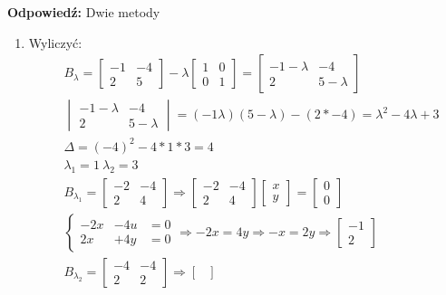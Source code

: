 \begin{enumerate}[label=\alph*)]
\textbf{Odpowiedź: } Dwie metody  
\begin{enumerate}[label=\Roman*:]
\item Wyliczyć:
\begin{align*}
&B_\lambda = \begin{bmatrix}
-1 & -4\\ 2 & 5
\end{bmatrix} - \lambda \begin{bmatrix}
1&0\\0&1
\end{bmatrix}=\begin{bmatrix}
-1-\lambda&-4\\
2&5-\lambda
\end{bmatrix}\\
&\begin{vmatrix}
-1-\lambda&-4\\
2&5-\lambda
\end{vmatrix}=(-1\lambda )(5-\lambda )-(2*-4)=\lambda ^2-4\lambda +3\\
&\Delta = (-4)^2-4*1*3=4\\
&\lambda _1 = 1\ \lambda _2 =3\\
&B_{\lambda _1}= \begin{bmatrix}
-2 & -4\\ 2 & 4
\end{bmatrix} \Rightarrow \begin{bmatrix}
-2 & -4\\ 2 & 4
\end{bmatrix} \begin{bmatrix}
x\\y
\end{bmatrix}=\begin{bmatrix}
0\\0
\end{bmatrix}\\
&\left\{\begin{matrix}
-2x &-4u &= 0\\
2x &+ 4y &= 0
\end{matrix}\right. \Rightarrow -2x = 4y\Rightarrow -x=2y \Rightarrow \begin{bmatrix}
-1 \\2
\end{bmatrix}\\
&B_{\lambda _2}= \begin{bmatrix}
-4 & -4\\ 2 & 2
\end{bmatrix} \Rightarrow \begin{bmatrix}

\end{bmatrix}
\end{align*}
\end{enumerate}
\end{enumerate}
